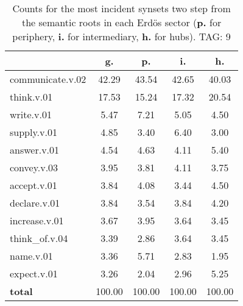 \begin{table}[h!]
\begin{center}
\begin{tabular}{| l || c | c | c | c |}\hline
 & {\bf g.} & {\bf p.} & {\bf i.} & {\bf h.} \\\hline\hline
communicate.v.02 & 42.29  & 43.54  & 42.65  & 40.03 \\\hline
think.v.01 & 17.53  & 15.24  & 17.32  & 20.54 \\\hline
write.v.01 & 5.47  & 7.21  & 5.05  & 4.50 \\\hline
supply.v.01 & 4.85  & 3.40  & 6.40  & 3.00 \\\hline
answer.v.01 & 4.54  & 4.63  & 4.11  & 5.40 \\\hline
convey.v.03 & 3.95  & 3.81  & 4.11  & 3.75 \\\hline
accept.v.01 & 3.84  & 4.08  & 3.44  & 4.50 \\\hline
declare.v.01 & 3.84  & 3.54  & 3.84  & 4.20 \\\hline
increase.v.01 & 3.67  & 3.95  & 3.64  & 3.45 \\\hline
think\_of.v.04 & 3.39  & 2.86  & 3.64  & 3.45 \\\hline
name.v.01 & 3.36  & 5.71  & 2.83  & 1.95 \\\hline
expect.v.01 & 3.26  & 2.04  & 2.96  & 5.25 \\\hline\hline
{{\bf total}} & 100.00  & 100.00  & 100.00  & 100.00 \\\hline
\end{tabular}
\caption{Counts for the most incident synsets two step from the semantic roots in each Erd\"os sector ({\bf p.} for periphery, {\bf i.} for intermediary, {\bf h.} for hubs). TAG: 9}
\end{center}
\end{table}